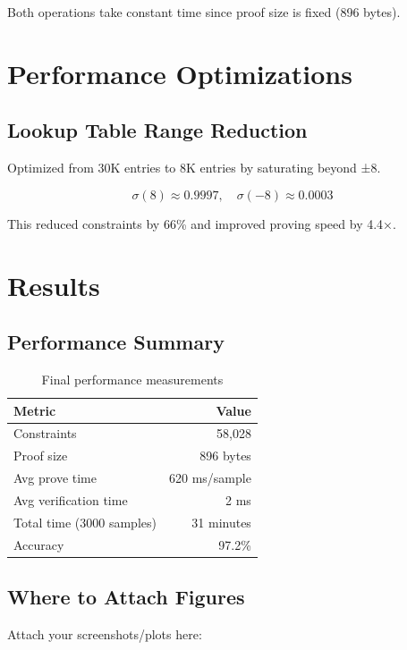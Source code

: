 Both operations take constant time since proof size is fixed (896 bytes).

\section{Performance Optimizations}\label{sec:optim}

\subsection{Lookup Table Range Reduction}
Optimized from 30K entries to 8K entries by saturating beyond ±8.

\[
\sigma(8) \approx 0.9997, \quad \sigma(-8) \approx 0.0003
\]

This reduced constraints by 66\% and improved proving speed by 4.4×.

\section{Results}\label{sec:results}

\subsection{Performance Summary}
\begin{table}[h]
\centering
\begin{tabular}{|l|r|}
\hline
Metric & Value \\
\hline
Constraints & 58,028 \\
Proof size & 896 bytes \\
Avg prove time & 620 ms/sample \\
Avg verification time & 2 ms \\
Total time (3000 samples) & ~31 minutes \\
Accuracy & 97.2\% \\
\hline
\end{tabular}
\caption{Final performance measurements}
\end{table}

\subsection{Where to Attach Figures}
Attach your screenshots/plots here:

